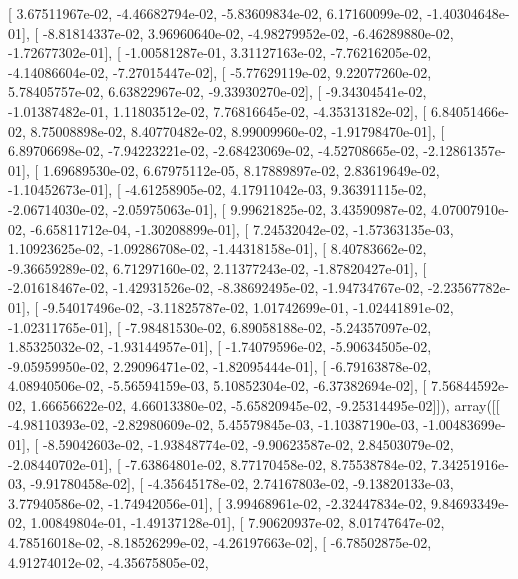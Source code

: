 \documentclass{article}
\begin{document}
       [  3.67511967e-02,  -4.46682794e-02,  -5.83609834e-02,
          6.17160099e-02,  -1.40304648e-01],
       [ -8.81814337e-02,   3.96960640e-02,  -4.98279952e-02,
         -6.46289880e-02,  -1.72677302e-01],
       [ -1.00581287e-01,   3.31127163e-02,  -7.76216205e-02,
         -4.14086604e-02,  -7.27015447e-02],
       [ -5.77629119e-02,   9.22077260e-02,   5.78405757e-02,
          6.63822967e-02,  -9.33930270e-02],
       [ -9.34304541e-02,  -1.01387482e-01,   1.11803512e-02,
          7.76816645e-02,  -4.35313182e-02],
       [  6.84051466e-02,   8.75008898e-02,   8.40770482e-02,
          8.99009960e-02,  -1.91798470e-01],
       [  6.89706698e-02,  -7.94223221e-02,  -2.68423069e-02,
         -4.52708665e-02,  -2.12861357e-01],
       [  1.69689530e-02,   6.67975112e-05,   8.17889897e-02,
          2.83619649e-02,  -1.10452673e-01],
       [ -4.61258905e-02,   4.17911042e-03,   9.36391115e-02,
         -2.06714030e-02,  -2.05975063e-01],
       [  9.99621825e-02,   3.43590987e-02,   4.07007910e-02,
         -6.65811712e-04,  -1.30208899e-01],
       [  7.24532042e-02,  -1.57363135e-03,   1.10923625e-02,
         -1.09286708e-02,  -1.44318158e-01],
       [  8.40783662e-02,  -9.36659289e-02,   6.71297160e-02,
          2.11377243e-02,  -1.87820427e-01],
       [ -2.01618467e-02,  -1.42931526e-02,  -8.38692495e-02,
         -1.94734767e-02,  -2.23567782e-01],
       [ -9.54017496e-02,  -3.11825787e-02,   1.01742699e-01,
         -1.02441891e-02,  -1.02311765e-01],
       [ -7.98481530e-02,   6.89058188e-02,  -5.24357097e-02,
          1.85325032e-02,  -1.93144957e-01],
       [ -1.74079596e-02,  -5.90634505e-02,  -9.05959950e-02,
          2.29096471e-02,  -1.82095444e-01],
       [ -6.79163878e-02,   4.08940506e-02,  -5.56594159e-03,
          5.10852304e-02,  -6.37382694e-02],
       [  7.56844592e-02,   1.66656622e-02,   4.66013380e-02,
         -5.65820945e-02,  -9.25314495e-02]]), array([[ -4.98110393e-02,  -2.82980609e-02,   5.45579845e-03,
         -1.10387190e-03,  -1.00483699e-01],
       [ -8.59042603e-02,  -1.93848774e-02,  -9.90623587e-02,
          2.84503079e-02,  -2.08440702e-01],
       [ -7.63864801e-02,   8.77170458e-02,   8.75538784e-02,
          7.34251916e-03,  -9.91780458e-02],
       [ -4.35645178e-02,   2.74167803e-02,  -9.13820133e-03,
          3.77940586e-02,  -1.74942056e-01],
       [  3.99468961e-02,  -2.32447834e-02,   9.84693349e-02,
          1.00849804e-01,  -1.49137128e-01],
       [  7.90620937e-02,   8.01747647e-02,   4.78516018e-02,
         -8.18526299e-02,  -4.26197663e-02],
       [ -6.78502875e-02,   4.91274012e-02,  -4.35675805e-02,
\end{document}
